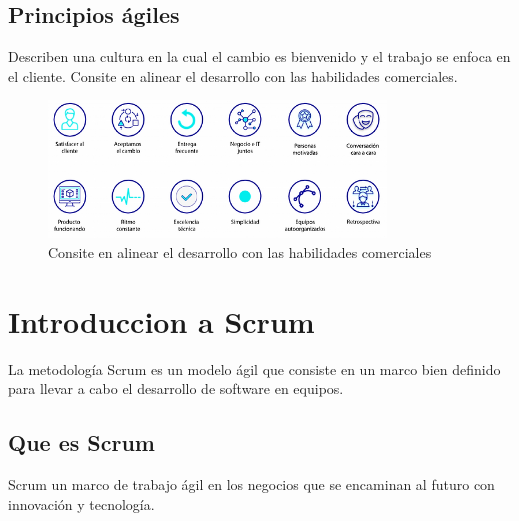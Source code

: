 \documentclass[12pt, letterpaper]{article}
\begin{document}


\subsection{Principios ágiles}

Describen una cultura en la cual el cambio es bienvenido y el trabajo se enfoca en el cliente. Consite en 
alinear el desarrollo con las habilidades comerciales.

\vspace{10pt} %

\begin{figure}[ht] %
    \centering
    \includegraphics[width=0.8\textwidth]{imagenes/principios.png}
    \caption{Consite en alinear el desarrollo con las habilidades comerciales}
    \label{fig:principios}
  \end{figure}

\vspace{10pt} %



\section{Introduccion a Scrum}

La metodología Scrum es un modelo ágil que consiste en un marco bien definido para llevar a cabo el desarrollo 
de software en equipos.



\subsection{Que es Scrum}

Scrum un marco de trabajo ágil en los negocios que se encaminan al futuro con innovación y tecnología.
\end{document}
